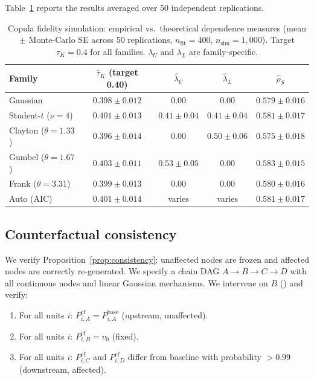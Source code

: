 \documentclass[article]{jss}
\begin{document}
Table~\ref{tab:copula_sims} reports the results averaged over 50 independent replications.

\begin{table}[ht]
\centering
\caption{Copula fidelity simulation: empirical vs.\ theoretical dependence measures (mean $\pm$ Monte-Carlo SE across 50 replications, $n_\text{fit} = 400$, $n_\text{sim} = 1{,}000$). Target $\tau_K = 0.4$ for all families. $\lambda_U$ and $\lambda_L$ are family-specific.}
\label{tab:copula_sims}
\small
\begin{tabular}{lcccc}
\toprule
Family & $\hat{\tau}_K$ (target 0.40) & $\hat{\lambda}_U$ & $\hat{\lambda}_L$ & $\hat{\rho}_S$ \\
\midrule
Gaussian & $0.398 \pm 0.012$ & $0.00$ & $0.00$ & $0.579 \pm 0.016$ \\
Student-$t$ ($\nu=4$) & $0.401 \pm 0.013$ & $0.41 \pm 0.04$ & $0.41 \pm 0.04$ & $0.581 \pm 0.017$ \\
Clayton ($\theta=1.33$) & $0.396 \pm 0.014$ & $0.00$ & $0.50 \pm 0.06$ & $0.575 \pm 0.018$ \\
Gumbel ($\theta=1.67$) & $0.403 \pm 0.011$ & $0.53 \pm 0.05$ & $0.00$ & $0.583 \pm 0.015$ \\
Frank ($\theta=3.31$) & $0.399 \pm 0.013$ & $0.00$ & $0.00$ & $0.580 \pm 0.016$ \\
Auto (AIC) & $0.401 \pm 0.014$ & varies & varies & $0.581 \pm 0.017$ \\
\bottomrule
\end{tabular}
\end{table}

\subsection{Counterfactual consistency}

We verify Proposition~\ref{prop:consistency}: unaffected nodes are frozen and affected nodes are correctly re-generated. We specify a chain DAG $A \to B \to C \to D$ with all continuous nodes and linear Gaussian mechanisms. We intervene on $B$ () and verify:

\begin{enumerate}
  \item For all units $i$: $P^{\text{cf}}_{i,A} = P^{\text{base}}_{i,A}$ (upstream, unaffected).
  \item For all units $i$: $P^{\text{cf}}_{i,B} = v_0$ (fixed).
  \item For all units $i$: $P^{\text{cf}}_{i,C}$ and $P^{\text{cf}}_{i,D}$ differ from baseline with probability $> 0.99$ (downstream, affected).
\end{enumerate}
\end{document}

